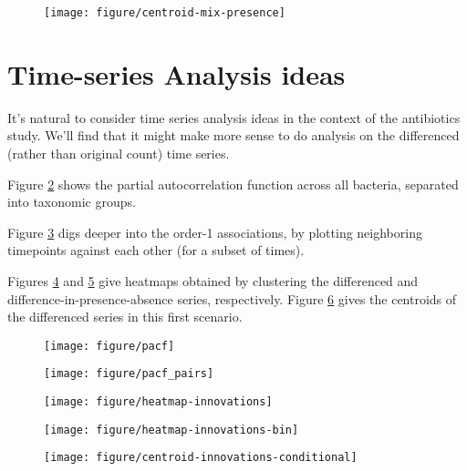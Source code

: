\documentclass{article}
\begin{document}
\begin{figure}[ht]
  \centering
  \texttt{[image: figure/centroid-mix-presence]}
  \caption{\label{fig:centroid-mix-conditional} }
\end{figure}

\section{Time-series Analysis ideas}

It's natural to consider time series analysis ideas in the context of the
antibiotics study. We'll find that it might make more sense to do analysis on
the differenced (rather than original count) time series.

Figure \ref{fig:pacf} shows the partial autocorrelation function across all bacteria, separated into taxonomic groups.

Figure \ref{fig:pacf_pairs} digs deeper into the order-1 associations, by
plotting neighboring timepoints against each other (for a subset of times).

Figures \ref{fig:heatmap-innovations} and \ref{fig:heatmap-innovations-bin} give
heatmaps obtained by clustering the differenced and
difference-in-presence-absence series, respectively. Figure
\ref{fig:centroid-innovations-conditional} gives the centroids of the
differenced series in this first scenario.

\begin{figure}[ht]
  \centering
  \texttt{[image: figure/pacf]}
  \caption{\label{fig:pacf} }
\end{figure}

\begin{figure}[ht]
  \centering
  \texttt{[image: figure/pacf\_pairs]}
  \caption{\label{fig:pacf_pairs} }
\end{figure}

\begin{figure}[ht]
  \centering
  \texttt{[image: figure/heatmap-innovations]}
  \caption{\label{fig:heatmap-innovations}}
\end{figure}

\begin{figure}[ht]
  \centering
  \texttt{[image: figure/heatmap-innovations-bin]}
  \caption{\label{fig:heatmap-innovations-bin}}
\end{figure}


\begin{figure}[ht]
  \centering
  \texttt{[image: figure/centroid-innovations-conditional]}
  \caption{\label{fig:centroid-innovations-conditional} }
\end{figure}
\end{document}
